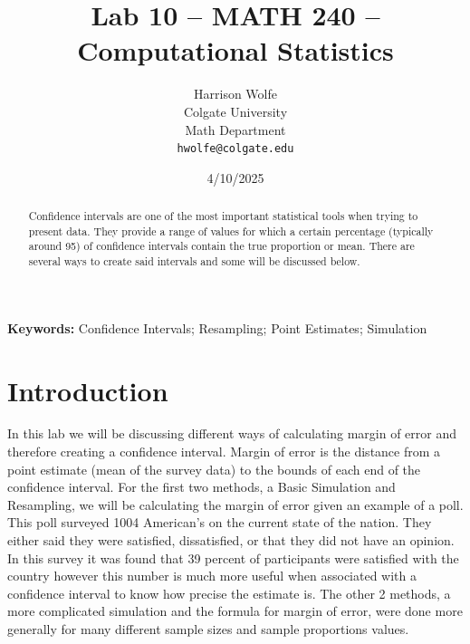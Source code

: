 \documentclass{article}\usepackage[]{graphicx}\usepackage[]{xcolor}
\begin{document}
\vspace{-1in}
\title{Lab 10 -- MATH 240 -- Computational Statistics}

\author{
  Harrison Wolfe \\
  Colgate University  \\
  Math Department  \\
  {\tt hwolfe@colgate.edu}
}

\date{4/10/2025}

\maketitle

\begin{multicols}{2}\raggedcolumns
\begin{abstract}
Confidence intervals are one of the most important statistical tools when trying to present data. They provide a range of values for which a certain percentage (typically around 95) of confidence intervals contain the true proportion or mean. There are several ways to create said intervals and some will be discussed below. 
\end{abstract}

\noindent \textbf{Keywords:} Confidence Intervals; Resampling; Point Estimates; Simulation

\section{Introduction}
In this lab we will be discussing different ways of calculating margin of error and therefore creating a confidence interval. Margin of error is the distance from a point estimate (mean of the survey data) to the bounds of each end of the confidence interval. For the first two methods, a Basic Simulation and Resampling, we will be calculating the margin of error given an example of a poll. This poll surveyed 1004 American's on the current state of the nation. They either said they were satisfied, dissatisfied, or that they did not have an opinion. In this survey it was found that 39 percent of participants were satisfied with the country however this number is much more useful when associated with a confidence interval to know how precise the estimate is. The other 2 methods, a more complicated simulation and the formula for margin of error, were done more generally for many different sample sizes and sample proportions values. 




\end{multicols}
\end{document}
